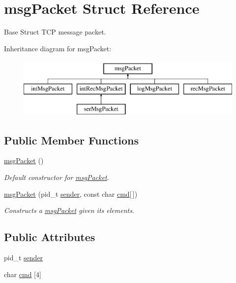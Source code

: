 \hypertarget{structmsgPacket}{\section{msg\-Packet Struct Reference}
\label{structmsgPacket}
}


Base Struct T\-C\-P message packet.  


Inheritance diagram for msg\-Packet\-:\begin{figure}[H]
\begin{center}
\leavevmode
\includegraphics[height=3.000000cm]{structmsgPacket}
\end{center}
\end{figure}
\subsection*{Public Member Functions}
\begin{DoxyCompactItemize}
\item 
\hypertarget{structmsgPacket_aac8ce5e662b88e38544d28343f1bf958}{\hyperlink{structmsgPacket_aac8ce5e662b88e38544d28343f1bf958}{msg\-Packet} ()}\label{structmsgPacket_aac8ce5e662b88e38544d28343f1bf958}

\begin{DoxyCompactList}\small\item\em Default constructor for \hyperlink{structmsgPacket}{msg\-Packet}. \end{DoxyCompactList}\item 
\hyperlink{structmsgPacket_ae7028f6d63c23ee4aca24e863f629ba3}{msg\-Packet} (pid\-\_\-t \hyperlink{structmsgPacket_a294c1f456116eb9177b31ab8b5577f86}{sender}, const char \hyperlink{structmsgPacket_a8b49c124b4ca2ed872692333b71d74fd}{cmd}\mbox{[}$\,$\mbox{]})
\begin{DoxyCompactList}\small\item\em Constructs a \hyperlink{structmsgPacket}{msg\-Packet} given its elements. \end{DoxyCompactList}\end{DoxyCompactItemize}
\subsection*{Public Attributes}
\begin{DoxyCompactItemize}
\item 
pid\-\_\-t \hyperlink{structmsgPacket_a294c1f456116eb9177b31ab8b5577f86}{sender}
\item 
char \hyperlink{structmsgPacket_a8b49c124b4ca2ed872692333b71d74fd}{cmd} \mbox{[}4\mbox{]}
\end{DoxyCompactItemize}


